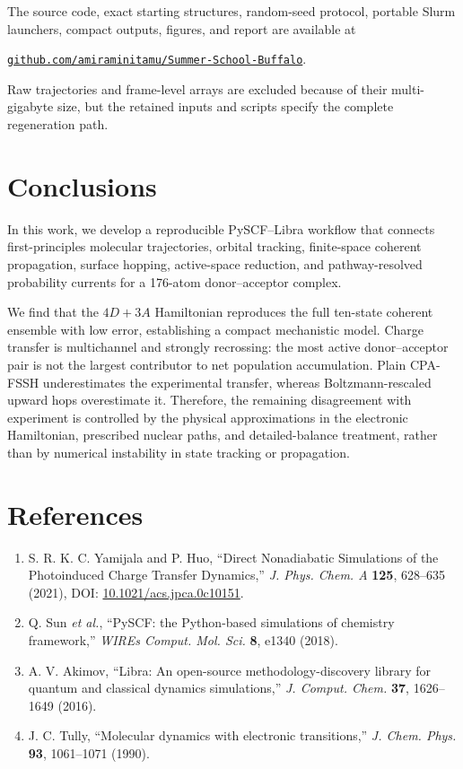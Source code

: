 \documentclass[11pt]{article}
\newcommand{\code}[1]{\texttt{#1}}
\begin{document}
The source code, exact starting structures, random-seed protocol, portable Slurm launchers, compact outputs, figures, and report are available at
\begin{center}
\href{https://github.com/amiraminitamu/Summer-School-Buffalo}{\code{github.com/amiraminitamu/Summer-School-Buffalo}}.
\end{center}
Raw trajectories and frame-level arrays are excluded because of their multi-gigabyte size, but the retained inputs and scripts specify the complete regeneration path.

\section{Conclusions}
In this work, we develop a reproducible PySCF--Libra workflow that connects first-principles molecular trajectories, orbital tracking, finite-space coherent propagation, surface hopping, active-space reduction, and pathway-resolved probability currents for a 176-atom donor--acceptor complex.

We find that the $4D+3A$ Hamiltonian reproduces the full ten-state coherent ensemble with low error, establishing a compact mechanistic model. Charge transfer is multichannel and strongly recrossing: the most active donor--acceptor pair is not the largest contributor to net population accumulation. Plain CPA-FSSH underestimates the experimental transfer, whereas Boltzmann-rescaled upward hops overestimate it. Therefore, the remaining disagreement with experiment is controlled by the physical approximations in the electronic Hamiltonian, prescribed nuclear paths, and detailed-balance treatment, rather than by numerical instability in state tracking or propagation.

\section*{References}
\small
\begin{enumerate}[label={\arabic*.},leftmargin=1.6em]
\item S. R. K. C. Yamijala and P. Huo, ``Direct Nonadiabatic Simulations of the Photoinduced Charge Transfer Dynamics,'' \emph{J. Phys. Chem. A} \textbf{125}, 628--635 (2021), DOI: \href{https://doi.org/10.1021/acs.jpca.0c10151}{10.1021/acs.jpca.0c10151}.
\item Q. Sun \emph{et al.}, ``PySCF: the Python-based simulations of chemistry framework,'' \emph{WIREs Comput. Mol. Sci.} \textbf{8}, e1340 (2018).
\item A. V. Akimov, ``Libra: An open-source methodology-discovery library for quantum and classical dynamics simulations,'' \emph{J. Comput. Chem.} \textbf{37}, 1626--1649 (2016).
\item J. C. Tully, ``Molecular dynamics with electronic transitions,'' \emph{J. Chem. Phys.} \textbf{93}, 1061--1071 (1990).
\end{enumerate}
\end{document}
